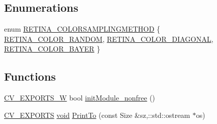 \subsection*{Enumerations}
\begin{DoxyCompactItemize}
\item 
enum \hyperlink{namespacecv_a1009b8eb0eac217a128fb5752f887287}{R\-E\-T\-I\-N\-A\-\_\-\-C\-O\-L\-O\-R\-S\-A\-M\-P\-L\-I\-N\-G\-M\-E\-T\-H\-O\-D} \{ \hyperlink{namespacecv_a1009b8eb0eac217a128fb5752f887287a60a491295228ec02bc9f039fd43bef69}{R\-E\-T\-I\-N\-A\-\_\-\-C\-O\-L\-O\-R\-\_\-\-R\-A\-N\-D\-O\-M}, 
\hyperlink{namespacecv_a1009b8eb0eac217a128fb5752f887287a2603090974ddec4844d916c501ef8363}{R\-E\-T\-I\-N\-A\-\_\-\-C\-O\-L\-O\-R\-\_\-\-D\-I\-A\-G\-O\-N\-A\-L}, 
\hyperlink{namespacecv_a1009b8eb0eac217a128fb5752f887287ae25654a2d7593d5c498cc9229374895a}{R\-E\-T\-I\-N\-A\-\_\-\-C\-O\-L\-O\-R\-\_\-\-B\-A\-Y\-E\-R}
 \}
\end{DoxyCompactItemize}
\subsection*{Functions}
\begin{DoxyCompactItemize}
\item 
\hyperlink{core_2types__c_8h_a67ea671a3582ce612ac3c281e067f480}{C\-V\-\_\-\-E\-X\-P\-O\-R\-T\-S\-\_\-\-W} bool \hyperlink{namespacecv_a1f895e87da11c1f66d7e450a70ee0545}{init\-Module\-\_\-nonfree} ()
\item 
\hyperlink{core_2types__c_8h_a1bf9f0e121b54272da02379cfccd0a2b}{C\-V\-\_\-\-E\-X\-P\-O\-R\-T\-S} \hyperlink{legacy_8hpp_a8bb47f092d473522721002c86c13b94e}{void} \hyperlink{namespacecv_a7ef2863dc6f9734c87da94fbc097e086}{Print\-To} (const Size \&sz,\-::std\-::ostream $\ast$os)
\end{DoxyCompactItemize}


